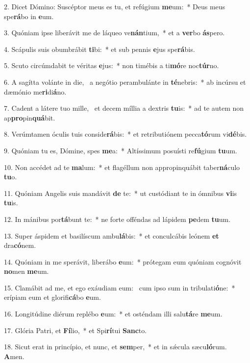 2. Dicet Dómino: Suscéptor meus es tu, et refúgium \textbf{me}um:~*  Deus meus spe\textbf{rá}bo in \textbf{e}um.\

3. Quóniam ipse liberávit me de láqueo ve\textbf{nán}tium,~*  et a \textbf{ver}bo \textbf{ás}pero.\

4. Scápulis suis obumbrábit \textbf{ti}bi:~*  et sub pennis \textbf{e}jus spe\textbf{rá}bis.\

5. Scuto circúmdabit te véritas \textbf{e}jus:~*  non timébis a ti\textbf{mó}re noc\textbf{túr}no.\

6. A sagítta volánte in die, \dag\  a negótio perambulánte in \textbf{té}nebris:~*  ab incúrsu et dæmónio me\textbf{ri}di\textbf{á}no.\

7. Cadent a látere tuo mille, \dag\  et decem míllia a dextris \textbf{tu}is:~*  ad te autem non ap\textbf{pro}pin\textbf{quá}bit.\

8. Verúmtamen óculis tuis conside\textbf{rá}bis:~*  et retributiónem pecca\textbf{tó}rum vi\textbf{dé}bis.\

9. Quóniam tu es, Dómine, spes \textbf{me}a:~*  Altíssimum posuísti re\textbf{fú}gium \textbf{tu}um.\

10. Non accédet ad te \textbf{ma}lum:~*  et flagéllum non appropinquábit taber\textbf{ná}culo \textbf{tu}o.\

11. Quóniam Angelis suis mandávit \textbf{de} te:~*  ut custódiant te in ómnibus \textbf{vi}is \textbf{tu}is.\

12. In mánibus por\textbf{tá}bunt te:~*  ne forte offéndas ad lápidem \textbf{pe}dem \textbf{tu}um.\

13. Super áspidem et basilíscum ambu\textbf{lá}bis:~*  et conculcábis leónem \textbf{et} dra\textbf{có}nem.\

14. Quóniam in me sperávit, liberábo \textbf{e}um:~*  prótegam eum quóniam cognóvit \textbf{no}men \textbf{me}um.\

15. Clamábit ad me, et ego exáudiam eum: \dag\  cum ipso sum in tribulati\textbf{ó}ne:~*  erípiam eum et glorifi\textbf{cá}bo \textbf{e}um.\

16. Longitúdine diérum replébo \textbf{e}um:~*  et osténdam illi salu\textbf{tá}re \textbf{me}um.\

17. Glória Patri, et \textbf{Fí}lio,~*  et Spi\textbf{rí}tui \textbf{Sanc}to.\

18. Sicut erat in princípio, et nunc, et \textbf{sem}per,~*  et in sǽcula sæcu\textbf{ló}rum. \textbf{A}men.\

